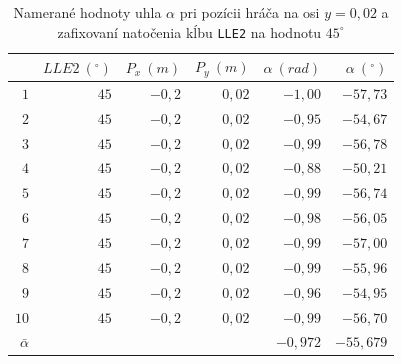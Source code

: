 \begin{table}[H]
	\centering
	\begin{tabular}{||r||r|r|r||r|r||}
	\hline
	\hline
	& $LLE2~(^{\circ})$ & $P_x~(m)$ & $P_y~(m)$ &  $\alpha~(rad)$ & $\alpha~(^{\circ})$\\
	\hline
	\hline
	$1$ & $45$ & $-0,2$ & $0,02$ & $-1,00$ & $-57,73$ \\ 
	\hline
	$2$ & $45$ & $-0,2$ & $0,02$ & $-0,95$ & $-54,67$ \\ 
	\hline
	$3$ & $45$ & $-0,2$ & $0,02$ & $-0,99$ & $-56,78$ \\ 
	\hline
	$4$ & $45$ & $-0,2$ & $0,02$ & $-0,88$ & $-50,21$ \\ 
	\hline
	$5$ & $45$ & $-0,2$ & $0,02$ & $-0,99$ & $-56,74$ \\ 
	\hline
	$6$ & $45$ & $-0,2$ & $0,02$ & $-0,98$ & $-56,05$ \\ 
	\hline
	$7$ & $45$ & $-0,2$ & $0,02$ & $-0,99$ & $-57,00$ \\ 
	\hline
	$8$ & $45$ & $-0,2$ & $0,02$ & $-0,99$ & $-55,96$ \\ 
	\hline
	$9$ & $45$ & $-0,2$ & $0,02$ & $-0,96$ & $-54,95$ \\ 
	\hline
	$10$ & $45$ & $-0,2$ & $0,02$ & $-0,99$ & $-56,70$  \\ 
	\hline
	\hline
	$\bar{\alpha}$ & & & & $-0,972$ & $-55,679$ \\
	\hline
	\hline
	\end{tabular}
	\caption{Namerané hodnoty uhla $\alpha$ pri pozícii hráča na osi $y=0,02$ a zafixovaní natočenia kĺbu \texttt{LLE2} na hodnotu $45^{\circ}$}
	\label{tab_max_lle2_biliard_45}
\end{table}

